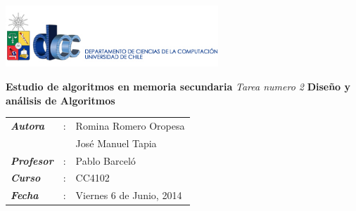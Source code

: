 \documentclass[
12pt, %
letterpaper, %
oneside, %
headinclude,footinclude, %
BCOR5mm, %
]{scrartcl}
\begin{document}

\renewcommand{\sectionmark}[1]{\markright{\spacedlowsmallcaps{#1}}} %
\lehead{\mbox{\llap{\small\thepage\kern1em\color{halfgray} \vline}\color{halfgray}\hspace{0.5em}\rightmark\hfil}} %

\pagestyle{scrheadings} %

\begin{flushright}
\includegraphics[width=8cm]{dcc.jpg}
\end{flushright}	
\vskip50mm
\begin{center}
\huge\textbf{Estudio de algoritmos en memoria secundaria}
\vskip2mm
\LARGE\textit{Tarea numero 2}
\vskip5mm
\Large\textbf{Diseño y análisis de Algoritmos}
\normalsize
\end{center}
\vskip70mm

\begin{tabular}{lll}
\textbf{\textit{Autora}} & : & Romina Romero Oropesa \\
						& & José Manuel Tapia\\
\textbf{\textit{Profesor}} & : & Pablo Barceló\\
\textbf{\textit{Curso}} & : & CC4102 \\ 
\textbf{\textit{Fecha}} & : & Viernes 6 de Junio, 2014
\end{tabular}

\newpage
\end{document}
